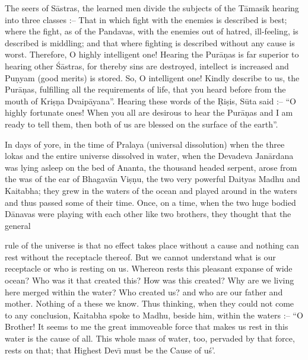 The seers of S\=astras, the learned men divide the subjects of the T\=amasik hearing into three classes :-- That in which fight with the enemies is described is best; where the fight, as of the Pandavas, with the enemies out of hatred, ill-feeling, is described is middling; and that where fighting is described without any cause is worst. Therefore, O highly intelligent one! Hearing the Pur\=a\d{n}as is far superior to hearing other \'S\=astras, for thereby sins are destroyed, intellect is increased and Pu\d{n}yam (good merits) is stored. So, O intelligent one! Kindly describe to us, the Pur\=a\d{n}as, fulfilling all the requirements of life, that you heard before from the mouth of Kri\d{s}\d{n}a Dvaip\=ayana''. Hearing these words of the \d{R}i\d{s}is, S\=uta said :-- ``O highly fortunate ones! When you all are desirous to hear the Pur\=a\d{n}as and I am ready to tell them, then both of us are blessed on the surface of the earth''.

In days of yore, in the time of Pralaya (universal dissolution) when the three lokas and the entire universe dissolved in water, when the Devadeva Jan\=ardana was lying asleep on the bed of Ananta, the thousand headed serpent, arose from the was of the ear of Bhagav\=an Vi\d{s}\d{n}u, the two very powerful Daityas Madhu and Kaitabha; they grew in the waters of the ocean and played around in the waters and thus passed some of their time. Once, on a time, when the two huge bodied D\=anavas were playing with each other like two brothers, they thought that the general

rule of the universe is that no effect takes place without a cause and nothing can rest without the receptacle thereof. But we cannot understand what is our receptacle or who is resting on us. Whereon rests this pleasant expanse of wide ocean? Who was it that created this? How was this created? Why are we living here merged within the water? Who created us? and who are our father and mother. Nothing of a these we know. Thus thinking, when they could not come to any conclusion, Kaitabha spoke to Madhu, beside him, within the waters :-- ``O Brother! It seems to me the great immoveable force that makes us rest in this water is the cause of all. This whole mass of water, too, pervaded by that force, rests on that; that Highest Dev\={\i} must be the Cause of u\'s'.

